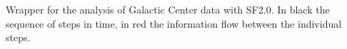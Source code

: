Wrapper for the analysis of Galactic Center data with SF2.0. In black the sequence of steps in time, in red the information flow between the individual steps.
  